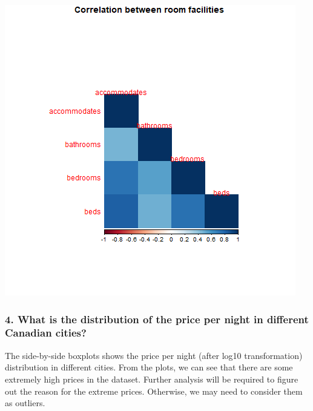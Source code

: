 \documentclass[
]{article}
\begin{document}
\includegraphics{../Images/Correlation_between_room_facilities.png}

\hypertarget{what-is-the-distribution-of-the-price-per-night-in-different-canadian-cities}{%
\subsubsection{4. What is the distribution of the price per night in
different Canadian
cities?}\label{what-is-the-distribution-of-the-price-per-night-in-different-canadian-cities}}

The side-by-side boxplots shows the price per night (after log10
transformation) distribution in different cities. From the plots, we can
see that there are some extremely high prices in the dataset. Further
analysis will be required to figure out the reason for the extreme
prices. Otherwise, we may need to consider them as outliers.
\end{document}

